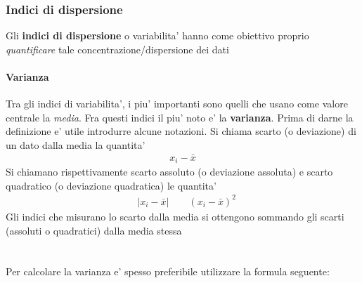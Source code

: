 \documentclass[a4paper,12pt]{article}
\begin{document}
\subsubsection{Indici di dispersione}
Gli \textbf{indici di dispersione} o variabilita' hanno come obiettivo proprio \textit{quantificare} tale concentrazione/dispersione dei dati
\paragraph{Varianza} Tra gli indici di variabilita', i piu' importanti sono quelli che usano come
valore centrale la \textit{media}. Fra questi indici il piu' noto e' la \textbf{varianza}. Prima di darne la
definizione e' utile introdurre alcune notazioni. Si chiama scarto (o deviazione) di un dato
dalla media la quantita'
\begin{align*}
  x_i - \bar{x}
\end{align*}
Si chiamano rispettivamente scarto assoluto (o deviazione assoluta) e scarto quadratico
(o deviazione quadratica) le quantita'
\begin{align*}
  & |x_i - \bar{x}| \qquad (x_i - \bar{x})^2
\end{align*}
Gli indici che misurano lo scarto dalla media si ottengono sommando gli scarti (assoluti o quadratici) dalla media stessa \\
\\
\vspace{1em}\\
Per calcolare la varianza e' spesso preferibile utilizzare la formula seguente:\\
\vspace{1px}\\
\\
\vspace{1em}\\
\end{document}
